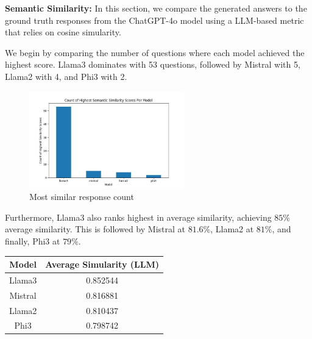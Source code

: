 \documentclass[]{article}
\begin{document}
\textbf{Semantic Similarity:} 
In this section, we compare the generated answers to the ground truth responses from the ChatGPT-4o model using a LLM-based metric that relies on cosine simularity.  

We begin by comparing the number of questions where each model achieved the highest score. Llama3 dominates with 53 questions, 
followed by Mistral with 5, Llama2 with 4, and Phi3 with 2.

\begin{figure}[H]
    \centering
    \includegraphics[width=0.6\textwidth]{./images/highest_count_zara.jpg}
    \caption{Most similar response count}
    \label{fig:image_label}
\end{figure}

Furthermore, Llama3 also ranks highest in average similarity, achieving $85\%$ average similarity. This is followed by Mistral at $81.6\%$, Llama2 at $81\%$, and finally, Phi3 at $79\%$.

\begin{center}
    \begin{tabular}{||c c||} 
     \hline
     \textbf{Model} & \textbf{Average Simularity (LLM)}  \\ [0.5ex] 
     \hline
     Llama3 & 0.852544\\ 
     \hline
     Mistral & 0.816881\\ 
     \hline
     Llama2 & 0.810437 \\
     \hline
     Phi3 & 0.798742\\
     \hline
    \end{tabular}
\end{center}
\end{document}

